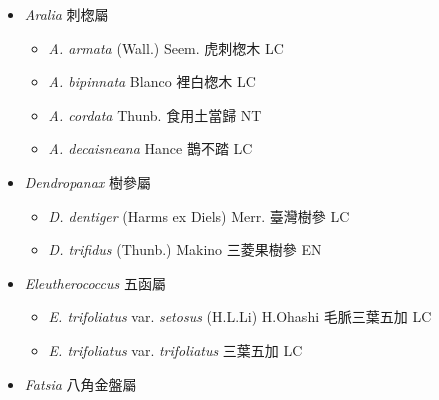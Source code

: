 
  \begin{itemize}
 \item[] \textit{Aralia} 刺楤屬
                                
  \begin{itemize}
        \item[] \textit{A. armata} (Wall.) Seem.  虎刺楤木   LC
        \item[] \textit{A. bipinnata} Blanco  裡白楤木   LC
        \item[] \textit{A. cordata} Thunb.  食用土當歸   NT
        \item[] \textit{A. decaisneana} Hance  鵲不踏   LC
  \end{itemize}
 \item[] \textit{Dendropanax} 樹參屬
                                
  \begin{itemize}
        \item[] \textit{D. dentiger} (Harms ex Diels) Merr.  臺灣樹參   LC
        \item[] \textit{D. trifidus} (Thunb.) Makino  三菱果樹參   EN
  \end{itemize}
 \item[] \textit{Eleutherococcus} 五函屬
                                
  \begin{itemize}
        \item[] \textit{E. trifoliatus} var. \textit{setosus} (H.L.Li) H.Ohashi  毛脈三葉五加   LC
        \item[] \textit{E. trifoliatus} var. \textit{trifoliatus}   三葉五加   LC
  \end{itemize}
 \item[] \textit{Fatsia} 八角金盤屬
                                

\end{itemize}
